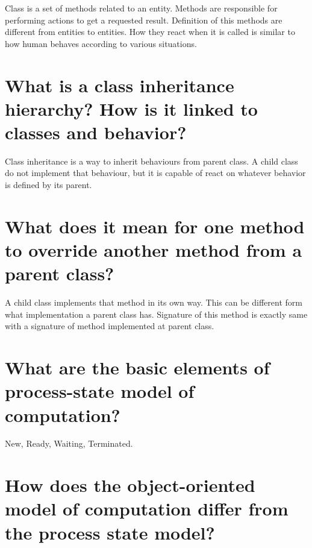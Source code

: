 Class is a set of methods related to an entity. Methods are responsible for
performing actions to get a requested result. Definition of this methods are
different from entities to entities. How they react when it is called is
similar to how human behaves according to various situations.

\section {
  What is a class inheritance hierarchy? How is it linked to classes and
  behavior?
}

Class inheritance is a way to inherit behaviours from parent class. A child
class do not implement that behaviour, but it is capable of react on whatever
behavior is defined by its parent.

\section {
  What does it mean for one method to override another method from a parent
  class?
}

A child class implements that method in its own way. This can be different form
what implementation a parent class has. Signature of this method is exactly
same with a signature of method implemented at parent class.

\section {
  What are the basic elements of process-state model of computation?
}

New, Ready, Waiting, Terminated.

\section {
  How does the object-oriented model of computation differ from the process
  state model?
}
